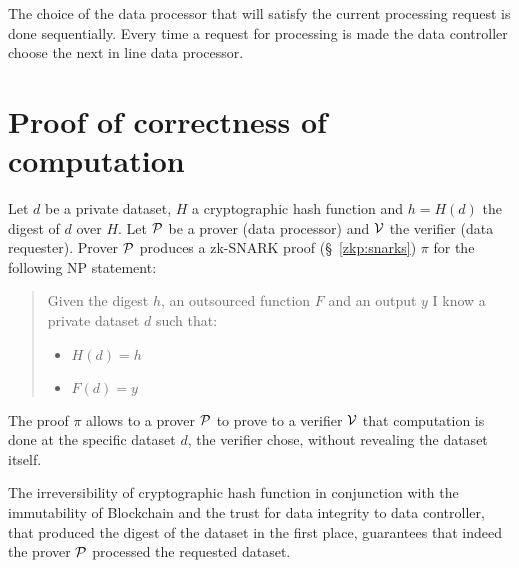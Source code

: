 The choice of the data processor that will satisfy the current processing request is done sequentially. Every time a request for processing is made the data controller choose the next in line data processor.

\section{Proof of correctness of computation}
\label{solution:proof}

Let $d$ be a private dataset, $H$ a cryptographic hash function and $h = H(d)$ the digest of $d$ over $H$. Let $\mathcal{P}$ be a prover (data processor) and $\mathcal{V}$ the verifier (data requester). Prover $\mathcal{P}$ produces a zk-SNARK proof (§~\ref{zkp:snarks}) $\pi$ for the following NP statement:

\blockquote{
  Given the digest $h$, an outsourced function $F$ and an output $y$ I know a private dataset $d$ such that:
    \begin{itemize}
      \item $H(d) = h$
      \item $F(d) = y$
    \end{itemize}
}

The proof $\pi$ allows to a prover $\mathcal{P}$ to prove to a verifier $\mathcal{V}$ that computation is done at the specific dataset $d$, the verifier chose, without revealing the dataset itself.

The irreversibility of cryptographic hash function in conjunction with the immutability of Blockchain and the trust for data integrity to data controller, that produced the digest of the dataset in the first place, guarantees that indeed the prover $\mathcal{P}$ processed the requested dataset.

